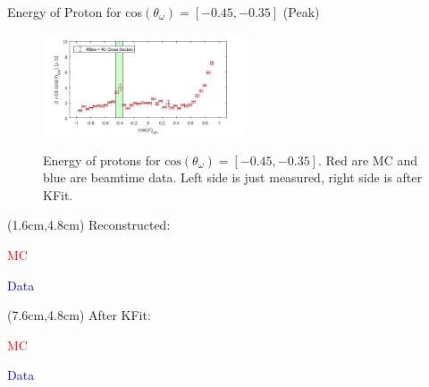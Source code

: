 \documentclass[
		10pt
		]{beamer}
\begin{document}
\begin{frame}{Energy of Proton for cos$(\theta_{\omega})=[-0.45,-0.35]$ (Peak)}

	
	\begin{figure}
		\hspace{0cm}  \vspace{-1cm}
		\includegraphics[width=6cm]{Plots/6}
	\end{figure}






\begin{figure}%
	\begin{center}

	\qquad
	
	\captionsetup{labelformat=empty}	
	\caption{Energy of protons for $\textrm{cos}(\theta_{\omega}) = [-0.45, -0.35] $. Red are MC and blue are beamtime data. Left side is just measured, right side is after KFit.}%
	
\end{center}
	
\end{figure}

\begin{textblock*}{4.5cm}(1.6cm,4.8cm)
	\footnotesize Reconstructed:
	
	\footnotesize \textcolor{red}{MC}
	
	\footnotesize \textcolor{blue}{Data}
\end{textblock*}

\begin{textblock*}{4.5cm}(7.6cm,4.8cm)
	\footnotesize After KFit:
	
	\footnotesize \textcolor{red}{MC}
	
	\footnotesize \textcolor{blue}{Data}
\end{textblock*}

	
\end{frame}
\end{document}
